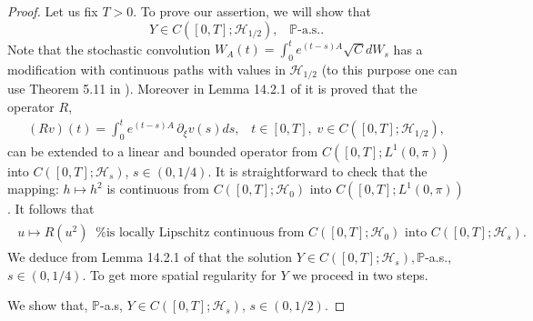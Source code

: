 \documentclass[preprint]{imsart}
\def\P{\mathbb P}
\begin{document}
\begin{proof}
Let us fix $T>0$. To prove our assertion, we will show that
\begin{equation}\label{s119}
 Y \in C([0,T]; {\mathcal H}_{1/2}), \;\;\; \P\text{-a.s.}.
\end{equation}
Note that the stochastic convolution $W_A(t)= \int_{0}^{t}e^{\left(  t-s\right)  A} \sqrt{C} dW_{s}$ has a modification with continuous paths with values in ${\mathcal H}_{1/2}$
(to this purpose one can use Theorem 5.11 in \cite{DZ}).  
  Moreover in  Lemma 14.2.1 of \cite{ergodicity} it is proved that the operator $R$,
\begin{equation}\label{dz1}
\begin{array}{l}
(Rv)(t) = \int_{0}^{t} e^{(  t-s)  A} \, \partial_{\xi}  
v(s)ds ,\;\;\; t \in [0,T],\;   v \in C([0,T]; {\mathcal H}_{1/2}),
\end{array} 
\end{equation}
can be extended to a linear and bounded operator from $C([0,T]; L^1(0, \pi))$ 
 into $C([0,T]; {\mathcal H}_s)$, $s \in (0, 1/4)$. 
 It is straightforward to check that   the mapping: $ h \mapsto h^2$ is 
  continuous from $C([0,T]; {\mathcal H}_0)$ into $C([0,T]; L^1(0, \pi))$. 
  It follows that  
\begin{gather*}
 \begin{array}{l}
u \mapsto R (u^2) \;\; \text{
 continuous  from $C([0,T]; {\mathcal H}_0)$ into $C([0,T]; {\mathcal H}_s)$.}
 \end{array}
\end{gather*} 
We deduce from  Lemma 14.2.1 of \cite{ergodicity} that the solution $Y \in C([0,T]; {\mathcal H}_{s}),   \P$-a.s., $s \in (0,1/4)$. To get more spatial regularity for $Y$  we proceed in two steps.

\vskip 1mm 
  We show that, $ \P$-a.s,  $Y \in C([0,T]; {\mathcal H}_{s})$, $s \in (0,1/2)$.


\end{proof}
\end{document}
